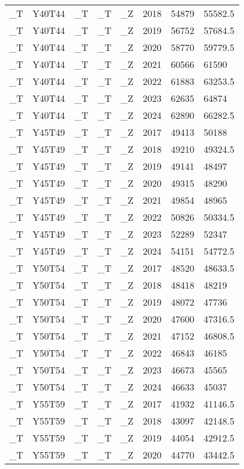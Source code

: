 \begin{longtable}[t]{llllllll}
\_T & Y40T44 & \_T & \_T & \_Z & 2018 & 54879 & 55582.5\\
\_T & Y40T44 & \_T & \_T & \_Z & 2019 & 56752 & 57684.5\\
\_T & Y40T44 & \_T & \_T & \_Z & 2020 & 58770 & 59779.5\\
\_T & Y40T44 & \_T & \_T & \_Z & 2021 & 60566 & 61590\\
\_T & Y40T44 & \_T & \_T & \_Z & 2022 & 61883 & 63253.5\\
\addlinespace
\_T & Y40T44 & \_T & \_T & \_Z & 2023 & 62635 & 64874\\
\_T & Y40T44 & \_T & \_T & \_Z & 2024 & 62890 & 66282.5\\
\_T & Y45T49 & \_T & \_T & \_Z & 2017 & 49413 & 50188\\
\_T & Y45T49 & \_T & \_T & \_Z & 2018 & 49210 & 49324.5\\
\_T & Y45T49 & \_T & \_T & \_Z & 2019 & 49141 & 48497\\
\addlinespace
\_T & Y45T49 & \_T & \_T & \_Z & 2020 & 49315 & 48290\\
\_T & Y45T49 & \_T & \_T & \_Z & 2021 & 49854 & 48965\\
\_T & Y45T49 & \_T & \_T & \_Z & 2022 & 50826 & 50334.5\\
\_T & Y45T49 & \_T & \_T & \_Z & 2023 & 52289 & 52347\\
\_T & Y45T49 & \_T & \_T & \_Z & 2024 & 54151 & 54772.5\\
\addlinespace
\_T & Y50T54 & \_T & \_T & \_Z & 2017 & 48520 & 48633.5\\
\_T & Y50T54 & \_T & \_T & \_Z & 2018 & 48418 & 48219\\
\_T & Y50T54 & \_T & \_T & \_Z & 2019 & 48072 & 47736\\
\_T & Y50T54 & \_T & \_T & \_Z & 2020 & 47600 & 47316.5\\
\_T & Y50T54 & \_T & \_T & \_Z & 2021 & 47152 & 46808.5\\
\addlinespace
\_T & Y50T54 & \_T & \_T & \_Z & 2022 & 46843 & 46185\\
\_T & Y50T54 & \_T & \_T & \_Z & 2023 & 46673 & 45565\\
\_T & Y50T54 & \_T & \_T & \_Z & 2024 & 46633 & 45037\\
\_T & Y55T59 & \_T & \_T & \_Z & 2017 & 41932 & 41146.5\\
\_T & Y55T59 & \_T & \_T & \_Z & 2018 & 43097 & 42148.5\\
\addlinespace
\_T & Y55T59 & \_T & \_T & \_Z & 2019 & 44054 & 42912.5\\
\_T & Y55T59 & \_T & \_T & \_Z & 2020 & 44770 & 43442.5\\

\end{longtable}
